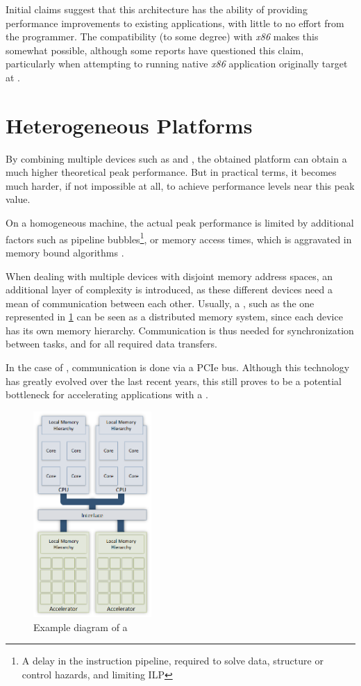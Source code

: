 \documentclass[main.tex]{subfiles}
\begin{document}
Initial claims suggest that this architecture has the ability of providing performance improvements to existing applications, with little to no effort from the programmer. The compatibility (to some degree) with \textit{x86} makes this somewhat possible, although some reports have questioned this claim, particularly when attempting to running native \textit{x86} application originally target at \xeon \cpus\cite{MIC:Nvidia}.


\section{Heterogeneous Platforms}

By combining multiple devices such as \cpus and \gpus, the obtained platform can obtain a much higher theoretical peak performance. But in practical terms, it becomes much harder, if not impossible at all, to achieve performance levels near this peak value.

On a homogeneous machine, the actual peak performance is limited by additional factors such as pipeline bubbles\footnote{A delay in the instruction pipeline, required to solve data, structure or control hazards, and limiting \ac{ILP} }, or memory access times, which is aggravated in memory bound algorithms \cite{williams2009roofline}.

When dealing with multiple devices with disjoint memory address spaces, an additional layer of complexity is introduced, as these different devices need a mean of communication between each other. Usually, a \hetplat, such as the one represented in \cref{fig:hetplat} can be seen as a distributed memory system, since each device has its own memory hierarchy. Communication is thus needed for synchronization between tasks, and for all required data transfers.

In the case of \gpus, communication is done via a \acs{PCIe} bus. Although this technology has greatly evolved over the last recent years, this still proves to be a potential bottleneck for accelerating applications with a \gpu.

\begin{figure}[!htb]
  \centering
  \includegraphics[width=0.4\textwidth]{visio/hetplats}
  \caption{Example diagram of a \hetplat \label{fig:hetplat}}
\end{figure}
\end{document}
